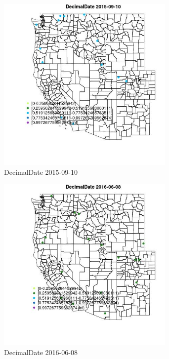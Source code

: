 \begin{figure} 
\centering  
\includegraphics[width=0.77\textwidth]{Code_Outputs/Report_ML_input_PM25_Step4_part_e_de_duplicated_aves_MapObsDecimalDate2015-09-10.jpg} 
\caption{\label{fig:Report_ML_input_PM25_Step4_part_e_de_duplicated_avesMapObsDecimalDate2015-09-10}DecimalDate 2015-09-10} 
\end{figure} 
 

\begin{figure} 
\centering  
\includegraphics[width=0.77\textwidth]{Code_Outputs/Report_ML_input_PM25_Step4_part_e_de_duplicated_aves_MapObsDecimalDate2016-06-08.jpg} 
\caption{\label{fig:Report_ML_input_PM25_Step4_part_e_de_duplicated_avesMapObsDecimalDate2016-06-08}DecimalDate 2016-06-08} 
\end{figure} 
 

